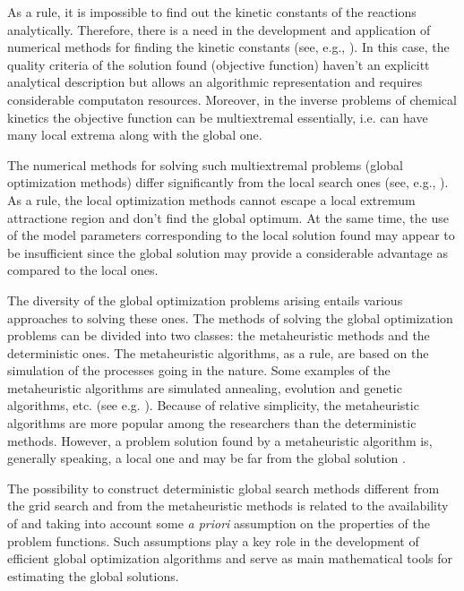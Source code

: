 \documentclass{svproc}
\begin{document}
As a rule, it is impossible to find out the kinetic constants of the reactions analytically. Therefore, there is a need in the development and application of numerical methods for finding the kinetic constants (see, e.g., \cite{Zaynullin2020,Enikeeva2020,Koledina2019,Enikeev2020,uskovfibrous,enikeeva2021,en13133393}). In this case, the quality criteria of the solution found (objective function) haven't an explicitt analytical description but allows an algorithmic representation and requires considerable computaton resources. Moreover, in the inverse problems of chemical kinetics the objective function can be multiextremal essentially, i.e. can have many local extrema along with the global one. 

The numerical methods for solving such multiextremal problems (global optimization methods) differ significantly from the local search ones (see, e.g., \cite{Sergeyev2017,PaulaviciusZilinskas2014}). As a rule, the local optimization methods cannot escape a local extremum attractione region and don't find the global optimum. At the same time, the use of the model parameters corresponding to the local solution found may appear to be insufficient since the global solution may provide a considerable advantage as compared to the local ones. 

The diversity of the global optimization problems arising entails various approaches to solving these ones. The methods of solving the global optimization problems can be divided into two classes: the metaheuristic methods and the deterministic ones. The metaheuristic algorithms, as a rule, are based on the simulation of the processes going in the nature. Some examples of the metaheuristic algorithms are simulated annealing, evolution and genetic algorithms, etc. (see e.g. \cite{Battiti2009,Eiben2015}). Because of relative simplicity, the metaheuristic algorithms are more popular among the researchers than the deterministic methods. 
However, a problem solution found by a metaheuristic algorithm is, generally speaking, a local one and may be far from the global solution \cite{Kvasov2018}. 

The possibility to construct deterministic global search methods different from the grid search and from the metaheuristic methods is related to the availability of and taking into account some {\it a priori} assumption on the properties of the problem functions. Such assumptions play a key role in the development of efficient global optimization algorithms and serve as main mathematical tools for estimating the global solutions.
\end{document}
